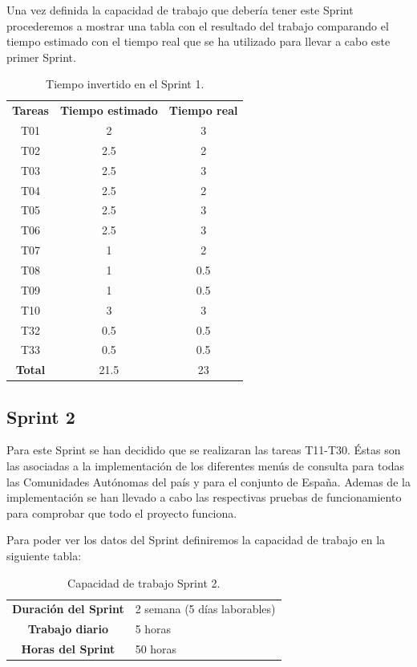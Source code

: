 Una vez definida la capacidad de trabajo que debería tener este Sprint procederemos a mostrar una tabla con el resultado del trabajo comparando el tiempo estimado con el tiempo real que se ha utilizado para llevar a cabo este primer Sprint.

\begin{table}[H]
	\begin{center}
		\begin{tabular}{| c | c | c |}
			\hline
			
			\textbf{Tareas} & \textbf{Tiempo estimado} & \textbf{Tiempo real} \\
			T01 & 2 & 3 \\
			T02 & 2.5 & 2 \\
			T03 & 2.5 & 3 \\
			T04 & 2.5 & 2 \\
			T05 & 2.5 & 3 \\
			T06 & 2.5 & 3 \\
			T07 & 1 & 2 \\
			T08 & 1 & 0.5 \\
			T09 & 1 & 0.5 \\
			T10 & 3 & 3 \\		
			T32 & 0.5 & 0.5 \\
			T33 & 0.5 & 0.5 \\
			\textbf{Total} & 21.5 & 23 \\ \hline
		\end{tabular}
		\caption{Tiempo invertido en el Sprint 1.}
	\end{center}
\end{table} 

\subsection{Sprint 2}

Para este Sprint se han decidido que se realizaran las tareas T11-T30. Éstas son las asociadas a la implementación de los diferentes menús de consulta para todas las Comunidades Autónomas del país y para el conjunto de España. Ademas de la implementación se han llevado a cabo las respectivas pruebas de funcionamiento para comprobar que todo el proyecto funciona.

Para poder ver los datos del Sprint definiremos la capacidad de trabajo en la siguiente tabla:

\begin{table}[H]
	\begin{center}
		\begin{tabular}{| c | p{9cm} |}
			\hline
			
			\textbf{Duración del Sprint} & 2 semana (5 días laborables) \\
			\textbf{Trabajo diario} & 5 horas \\
			\textbf{Horas del Sprint} & 50 horas \\ \hline
		\end{tabular}
		\caption{Capacidad de trabajo Sprint 2.}
	\end{center}
\end{table}

